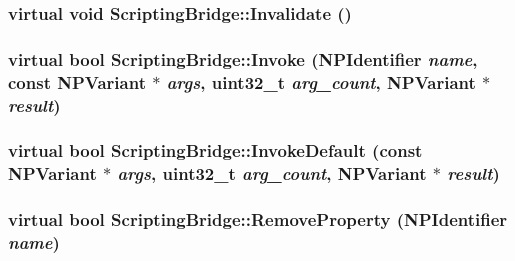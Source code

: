 \label{class_scripting_bridge_a744b9ecf0b3f4a39aa51c85b1ee5d5e9}
\hypertarget{class_scripting_bridge_a9ee60d17b25c9b968315b6a12a55d841}{
\subsubsection[{Invalidate}]{\setlength{\rightskip}{0pt plus 5cm}virtual void ScriptingBridge::Invalidate ()}}
\label{class_scripting_bridge_a9ee60d17b25c9b968315b6a12a55d841}
\hypertarget{class_scripting_bridge_a8c6d388d7c7e1660b267013143d0cdf5}{
\subsubsection[{Invoke}]{\setlength{\rightskip}{0pt plus 5cm}virtual bool ScriptingBridge::Invoke (NPIdentifier {\em name}, \/  const NPVariant $\ast$ {\em args}, \/  uint32\_\-t {\em arg\_\-count}, \/  NPVariant $\ast$ {\em result})}}
\label{class_scripting_bridge_a8c6d388d7c7e1660b267013143d0cdf5}
\hypertarget{class_scripting_bridge_a9045116428a296ea7073ffbdce73d80e}{
\subsubsection[{InvokeDefault}]{\setlength{\rightskip}{0pt plus 5cm}virtual bool ScriptingBridge::InvokeDefault (const NPVariant $\ast$ {\em args}, \/  uint32\_\-t {\em arg\_\-count}, \/  NPVariant $\ast$ {\em result})}}
\label{class_scripting_bridge_a9045116428a296ea7073ffbdce73d80e}
\hypertarget{class_scripting_bridge_a4948d9d87de0dc58627c8b377356df34}{
\subsubsection[{RemoveProperty}]{\setlength{\rightskip}{0pt plus 5cm}virtual bool ScriptingBridge::RemoveProperty (NPIdentifier {\em name})}}

